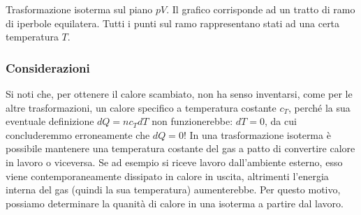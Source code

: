 \begin{marginfigure}
    \begin{center}
    \end{center}
    \caption{Trasformazione isoterma sul piano $pV$. Il
    grafico corrisponde ad un tratto di ramo di iperbole
    equilatera. Tutti i punti sul ramo rappresentano stati
    ad una certa temperatura $T$.}
\end{marginfigure}

\subsubsection*{Considerazioni}
Si noti che, per ottenere il calore scambiato, non ha
senso inventarsi, come per le altre trasformazioni, un calore specifico
a temperatura costante $c_T$, perché la sua eventuale definizione
$dQ = nc_TdT$ non funzionerebbe: $dT = 0$, da cui concluderemmo erroneamente che
$dQ = 0$! In una trasformazione isoterma è possibile
mantenere una temperatura costante del gas a patto di convertire
calore in lavoro o viceversa. Se ad esempio si riceve lavoro dall'ambiente esterno,
esso viene contemporaneamente dissipato in calore in uscita, altrimenti
l'energia interna del gas (quindi la sua temperatura) aumenterebbe.
Per questo motivo, possiamo determinare la quanità di calore in una
isoterma a partire dal lavoro.


